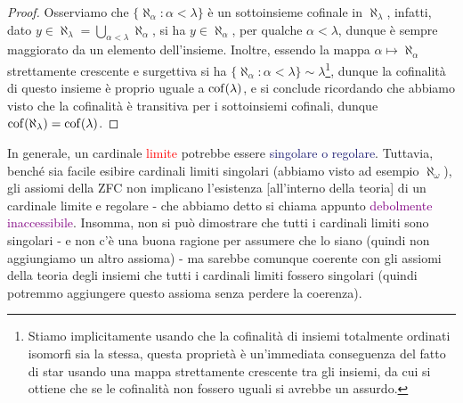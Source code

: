 \begin{proof}
	Osserviamo che $\{\aleph_\alpha : \alpha < \lambda\}$ è un sottoinsieme cofinale in $\aleph_\lambda$, infatti, dato $y \in \aleph_\lambda = \bigcup_{\alpha < \lambda} \aleph_\alpha$, si ha $y \in \aleph_\alpha$, per qualche $\alpha < \lambda$, dunque è sempre maggiorato da un elemento dell'insieme.
	Inoltre, essendo la mappa $\alpha \mapsto \aleph_\alpha$ strettamente crescente e surgettiva si ha $\{\aleph_\alpha : \alpha < \lambda\} \sim \lambda$\footnote{Stiamo implicitamente usando che la cofinalità di insiemi totalmente ordinati isomorfi sia la stessa, questa proprietà è un'immediata conseguenza del fatto di star usando una mappa 
	strettamente crescente tra gli insiemi, da cui si ottiene che se le cofinalità non fossero uguali si avrebbe un assurdo.}, dunque la cofinalità di questo insieme è proprio uguale a $\operatorname{cof}(\lambda)$, e si conclude ricordando che abbiamo visto che la cofinalità è transitiva per i sottoinsiemi cofinali, dunque $\operatorname{cof}(\aleph_\lambda) = \operatorname{cof}(\lambda)$.
\end{proof}
\pagebreak
\begin{note}
	In generale, un cardinale \textcolor{red}{limite} potrebbe essere \textcolor{MidnightBlue}{singolare o regolare}. Tuttavia, benché sia facile esibire cardinali limiti singolari (abbiamo visto ad esempio $\aleph_\omega$), gli assiomi della ZFC non implicano l'esistenza [all'interno della teoria]
	di un cardinale limite e regolare - che abbiamo detto si chiama appunto \textcolor{purple}{debolmente inaccessibile}. Insomma, non si può dimostrare che tutti i cardinali limiti sono singolari - e non c'è una buona ragione per assumere che lo siano (quindi non aggiungiamo un altro assioma) - ma sarebbe comunque coerente
	con gli assiomi della teoria degli insiemi che tutti i cardinali limiti fossero singolari (quindi potremmo aggiungere questo assioma senza perdere la coerenza).
\end{note}

